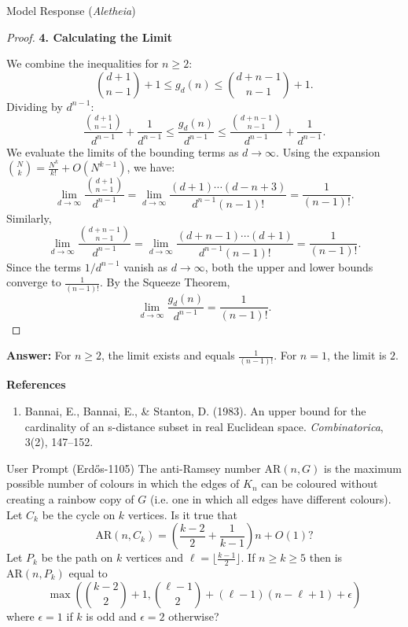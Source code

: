\documentclass[11pt]{article}
\begin{document}
\begin{solution}{Model Response (\emph{Aletheia})}
\begin{proof}
\textbf{4. Calculating the Limit}

We combine the inequalities for $n \ge 2$:
\[ \binom{d+1}{n-1} + 1 \le g_d(n) \le \binom{d+n-1}{n-1} + 1. \]
Dividing by $d^{n-1}$:
\[ \frac{\binom{d+1}{n-1}}{d^{n-1}} + \frac{1}{d^{n-1}} \le \frac{g_d(n)}{d^{n-1}} \le \frac{\binom{d+n-1}{n-1}}{d^{n-1}} + \frac{1}{d^{n-1}}. \]
We evaluate the limits of the bounding terms as $d \to \infty$.
Using the expansion $\binom{N}{k} = \frac{N^k}{k!} + O(N^{k-1})$, we have:
\[ \lim_{d\to \infty} \frac{\binom{d+1}{n-1}}{d^{n-1}} = \lim_{d\to \infty} \frac{(d+1)\cdots(d-n+3)}{d^{n-1}(n-1)!} = \frac{1}{(n-1)!}. \]
Similarly,
\[ \lim_{d\to \infty} \frac{\binom{d+n-1}{n-1}}{d^{n-1}} = \lim_{d\to \infty} \frac{(d+n-1)\cdots(d+1)}{d^{n-1}(n-1)!} = \frac{1}{(n-1)!}. \]
Since the terms $1/d^{n-1}$ vanish as $d \to \infty$, both the upper and lower bounds converge to $\frac{1}{(n-1)!}$.
By the Squeeze Theorem,
\[ \lim_{d\to \infty}\frac{g_d(n)}{d^{n-1}} = \frac{1}{(n-1)!}. \]

\end{proof}

\textbf{Answer:}
For $n \ge 2$, the limit exists and equals $\frac{1}{(n-1)!}$.
For $n=1$, the limit is $2$.

\textbf{References}
\begin{enumerate}
\item Bannai, E., Bannai, E., \& Stanton, D. (1983). An upper bound for the cardinality of an s-distance subset in real Euclidean space. \textit{Combinatorica}, 3(2), 147–152.
\end{enumerate}
\end{solution}

\begin{problem}{User Prompt (Erd\H{o}s-1105)}
    The anti-Ramsey number $\mathrm{AR}(n,G)$ is the maximum possible number of colours in which the edges of $K_n$ can be coloured without creating a rainbow copy of $G$ (i.e. one in which all edges have different colours). Let $C_k$ be the cycle on $k$ vertices. Is it true that\[\mathrm{AR}(n,C_k)=\left(\frac{k-2}{2}+\frac{1}{k-1}\right)n+O(1)?\]Let $P_k$ be the path on $k$ vertices and $\ell=\lfloor\frac{k-1}{2}\rfloor$. If $n\geq k\geq 5$ then is $\mathrm{AR}(n,P_k)$ equal to\[\max\left(\binom{k-2}{2}+1, \binom{\ell-1}{2}+(\ell-1)(n-\ell+1)+\epsilon\right)\]where $\epsilon=1$ if $k$ is odd and $\epsilon=2$ otherwise?
\end{problem}
\end{document}
